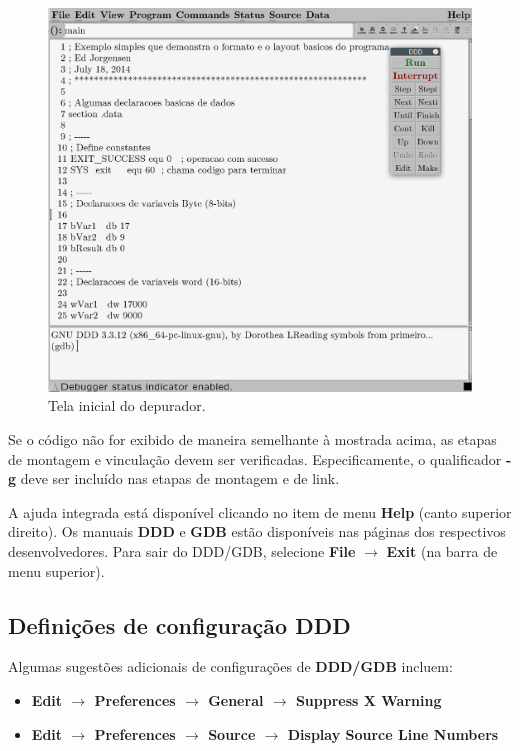 \begin{figure}
\begin{center}
		\includegraphics[width=0.8\linewidth]{imagens/ddd01}
\end{center}
	\caption{Tela inicial do depurador.}
\end{figure}

Se o código não for exibido de maneira semelhante à mostrada acima, as etapas de montagem e vinculação devem ser verificadas. Especificamente, o qualificador \textbf{-g} deve ser incluído nas etapas de montagem e de link.

A ajuda integrada está disponível clicando no item de menu \textbf{Help} (canto superior direito). Os manuais \textbf{DDD} e \textbf{GDB} estão disponíveis nas páginas dos respectivos desenvolvedores. Para sair do DDD/GDB, selecione \textbf{File} $\rightarrow$ \textbf{Exit} (na barra de menu superior).

\subsection{Definições de configuração DDD}
Algumas sugestões adicionais de configurações de \textbf{DDD/GDB} incluem:

\begin{itemize}
	\item \textbf{Edit $\rightarrow$ Preferences $\rightarrow$ General $\rightarrow$ Suppress X Warning}
	\item \textbf{Edit $\rightarrow$ Preferences $\rightarrow$ Source $\rightarrow$ Display Source Line Numbers}
\end{itemize}

